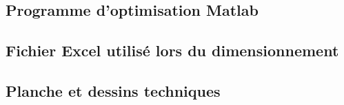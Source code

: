 \documentclass[a4paper, 11pt]{article} %
\begin{document}
\newpage
\subsection{Programme d'optimisation Matlab}
\label{prog}


\subsection{Fichier Excel utilisé lors du dimensionnement}

\subsection{Planche et dessins techniques}












\end{document}
